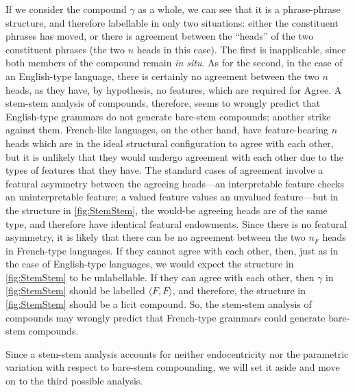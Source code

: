 \documentclass[MilwayThesis]{subfiles}
\begin{document}
If we consider the compound $\gamma$ as a whole, we can see that it is a phrase-phrase structure, and therefore labellable in only two situations:
	either the constituent phrases has moved, or there is agreement between the ``heads'' of the two constituent phrases (the two $n$ heads in this case).
The first is inapplicable, since both members of the compound remain \textit{in situ}.
As for the second, in the case of an English-type language, there is certainly no agreement between the two $n$ heads, as they have, by hypothesis, no features, which are required for Agree.
A stem-stem analysis of compounds, therefore, seems to wrongly predict that English-type grammars do not generate bare-stem compounds; another strike against them.
French-like languages, on the other hand, have feature-bearing $n$ heads which are in the ideal structural configuration to agree with each other, but it is unlikely that they would undergo agreement with each other due to the types of features that they have.
The standard cases of agreement involve a featural asymmetry between the agreeing heads---an interpretable feature checks an uninterpretable feature; a valued feature values an unvalued feature---but in the structure in \cref{fig:StemStem}, the would-be agreeing heads are of the same type, and therefore have identical featural endowments.
Since there is no featural asymmetry, it is likely that there can be no agreement between the two $n_{F}$ heads in French-type languages.
If they cannot agree with each other, then, just as in the case of English-type languages, we would expect the structure in \cref{fig:StemStem} to be unlabellable.
If they can agree with each other, then $\gamma$ in \cref{fig:StemStem} should be labelled $\langle F,F\rangle$, and therefore, the structure in \cref{fig:StemStem} should be a licit compound.
So, the stem-stem analysis of compounds may wrongly predict that French-type grammars could generate bare-stem compounds.

Since a stem-stem analysis accounts for neither endocentricity nor the parametric variation with respect to bare-stem compounding, we will set it aside and move on to the third possible analysis.
\end{document}
